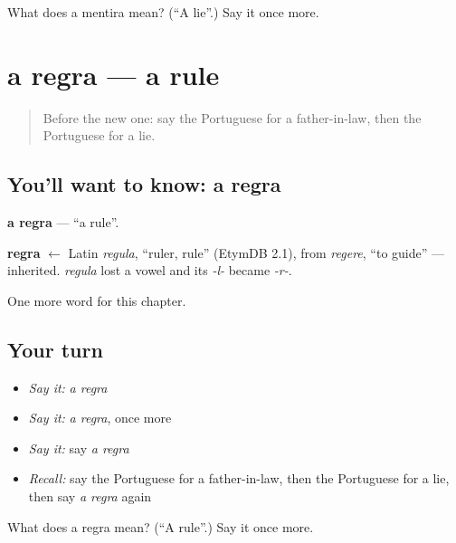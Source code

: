 \begin{tcolorbox}[breakable,colback=teal!4,colframe=teal!35!black,title={Before you move on}]
What does a mentira mean? (\textquotedblleft{}A lie\textquotedblright{}.) Say it once more.
\end{tcolorbox}
\section[a regra]{a regra — a rule}

\label{lesson:PT-C192-regra}



\begin{quote}
Before the new one: say the Portuguese for a father-in-law, then the Portuguese for a lie.
\end{quote}

\subsection*{You'll want to know: a regra}
\textbf{a regra} — \textquotedblleft{}a rule\textquotedblright{}.

\begin{cousinweb}
\textbf{regra} $\leftarrow$ Latin \emph{regula}, \textquotedblleft{}ruler, rule\textquotedblright{} (EtymDB 2.1), from \emph{regere}, \textquotedblleft{}to guide\textquotedblright{} — inherited. \emph{regula} lost a vowel and its \emph{-l-} became \emph{-r-}.
\end{cousinweb}

\begin{grammarlens}[title={What you've built}]
One more word for this chapter.
\end{grammarlens}

\subsection*{Your turn}
\begin{itemize}
\raggedright
  \item \emph{Say it:} \emph{a regra}
  \item \emph{Say it:} \emph{a regra}, once more
  \item \emph{Say it:} say \emph{a regra}
  \item \emph{Recall:} say the Portuguese for a father-in-law, then the Portuguese for a lie, then say \emph{a regra} again
\end{itemize}

\begin{tcolorbox}[breakable,colback=teal!4,colframe=teal!35!black,title={Before you move on}]
What does a regra mean? (\textquotedblleft{}A rule\textquotedblright{}.) Say it once more.
\end{tcolorbox}
